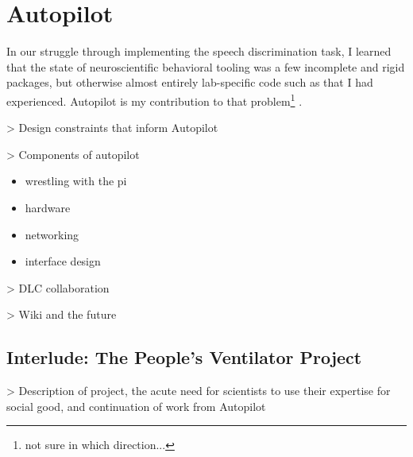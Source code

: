 \section{Autopilot}
\label{sec:autopilot}

In our struggle through implementing the speech discrimination task, I learned that the state of neuroscientific behavioral tooling was a few incomplete and rigid packages, but otherwise almost entirely lab-specific code such as that I had experienced. Autopilot is my contribution to that problem\footnote{not sure in which direction...} \cite{saundersAutopilotAutomatingBehavioral2019}.

> Design constraints that inform Autopilot

> Components of autopilot

\begin{itemize}
\item wrestling with the pi
\item hardware
\item networking
\item interface design
\end{itemize}

> DLC collaboration \cite{kaneRealtimeLowlatencyClosedloop2020}

> Wiki and the future



\subsection{Interlude: The People's Ventilator Project}

> Description of project, the acute need for scientists to use their expertise for social good, and continuation of work from Autopilot \cite{lachancePVP1PeopleVentilator2020}